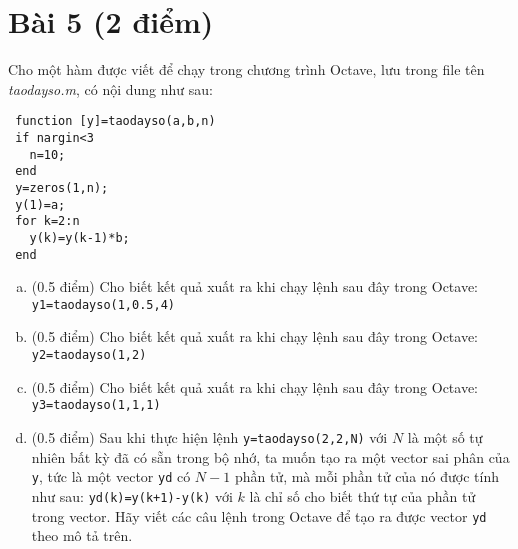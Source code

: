 \documentclass[11pt]{article}
\newcommand{\Solution}{
\medskip
{\bf \underline{Đáp án}:}
}
\begin{document}
\section{Bài 5 (2 điểm)}

Cho một hàm được viết để chạy trong chương trình Octave, lưu trong file tên \textit{taodayso.m}, có nội dung như sau:
\begin{verbatim}
 function [y]=taodayso(a,b,n)
 if nargin<3
   n=10;
 end
 y=zeros(1,n);
 y(1)=a;
 for k=2:n
   y(k)=y(k-1)*b;
 end
\end{verbatim}

\begin{enumerate}[a).]
 \item (0.5 điểm) Cho biết kết quả xuất ra khi chạy lệnh sau đây trong Octave: 
  \texttt{y1=taodayso(1,0.5,4)}
 \item (0.5 điểm) Cho biết kết quả xuất ra khi chạy lệnh sau đây trong Octave:
  \texttt{y2=taodayso(1,2)}
 \item (0.5 điểm) Cho biết kết quả xuất ra khi chạy lệnh sau đây trong Octave:
  \texttt{y3=taodayso(1,1,1)}
 \item (0.5 điểm) Sau khi thực hiện lệnh \texttt{y=taodayso(2,2,N)} với $N$ là một số tự nhiên bất kỳ đã có sẵn trong bộ nhớ, ta muốn tạo ra một vector sai phân của \texttt{y}, tức là một vector \texttt{yd} có $N-1$ phần tử, mà mỗi phần tử của nó được tính như sau: \texttt{yd(k)=y(k+1)-y(k)} với $k$ là chỉ số cho biết thứ tự của phần tử trong vector. Hãy viết các câu lệnh trong Octave để tạo ra được vector \texttt{yd} theo mô tả trên.
\end{enumerate}

% 
\end{document}
